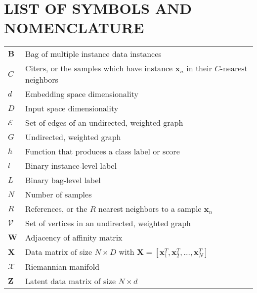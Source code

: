 

\chapter*{LIST OF SYMBOLS AND NOMENCLATURE}  %
\singlespacing
\begin{longtable}{l p{5in}} %

$\bm{B}$ & Bag of  multiple instance data instances \\
$C$ & Citers, or the samples which have instance $\bm{x}_{n}$ in their $C$-nearest neighbors\\
$d$ & Embedding space dimensionality\\
$D$ & Input space dimensionality\\
$\mathcal{E}$ & Set of edges of an undirected, weighted graph\\
$G$ & Undirected, weighted graph\\ 
$h$ & Function that produces a class label or score\\
$l$ & Binary instance-level label\\
$L$ & Binary bag-level label \\
$N$ & Number of samples\\
$R$ & References, or the $R$ nearest neighbors to a sample $\bm{x}_{n}$\\
$\mathcal{V}$ & Set of vertices in an undirected, weighted graph\\ 
$\bm{W}$ & Adjacency of affinity matrix\\
$\bm{X}$ & Data matrix of size $N \times D$ with $\bm{X} = [\bm{x}^{T}_{1}, \bm{x}^{T}_{2}, \dots, \bm{x}^{T}_{N}]$\\
$\mathcal{X}$ & Riemannian manifold\\
$\bm{Z}$ & Latent data matrix of size $N \times d$\\

\end{longtable}


\doublespacing


